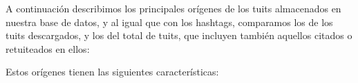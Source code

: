 A continuación describimos los principales orígenes de los tuits almacenados en 
nuestra base de datos, y al igual que con los hashtags, comparamos los de los tuits
descargados, y los del total de tuits, que incluyen también aquellos citados o retuiteados en ellos:


Estos orígenes tienen las siguientes características:
\label{page:sources_descriptions}
